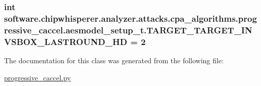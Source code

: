 \subsubsection[{T\+A\+R\+G\+E\+T\+\_\+\+T\+A\+R\+G\+E\+T\+\_\+\+I\+N\+V\+S\+B\+O\+X\+\_\+\+L\+A\+S\+T\+R\+O\+U\+N\+D\+\_\+\+H\+D}]{\setlength{\rightskip}{0pt plus 5cm}int software.\+chipwhisperer.\+analyzer.\+attacks.\+cpa\+\_\+algorithms.\+progressive\+\_\+caccel.\+aesmodel\+\_\+setup\+\_\+t.\+T\+A\+R\+G\+E\+T\+\_\+\+T\+A\+R\+G\+E\+T\+\_\+\+I\+N\+V\+S\+B\+O\+X\+\_\+\+L\+A\+S\+T\+R\+O\+U\+N\+D\+\_\+\+H\+D = 2\hspace{0.3cm}{\ttfamily [static]}}\label{classsoftware_1_1chipwhisperer_1_1analyzer_1_1attacks_1_1cpa__algorithms_1_1progressive__caccel_1_1aesmodel__setup__t_a2f6bc767502b33f7e4d8024ee87502c1}


The documentation for this class was generated from the following file\+:\begin{DoxyCompactItemize}
\item 
\hyperlink{progressive__caccel_8py}{progressive\+\_\+caccel.\+py}\end{DoxyCompactItemize}
